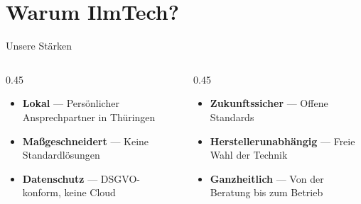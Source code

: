 \documentclass[aspectratio=169]{beamer}
\begin{document}
\section{Warum IlmTech?}

\begin{frame}{Unsere Stärken}
  \begin{columns}[T]
    \begin{column}{0.45\textwidth}
      \begin{itemize}
        \item \textcolor{ilm-blue}{\textbf{Lokal}} — Persönlicher Ansprechpartner in Thüringen
        \item \textcolor{ilm-blue}{\textbf{Maßgeschneidert}} — Keine Standardlösungen
        \item \textcolor{ilm-blue}{\textbf{Datenschutz}} — DSGVO-konform, keine Cloud
      \end{itemize}
    \end{column}
    \begin{column}{0.45\textwidth}
      \begin{itemize}
        \item \textcolor{ilm-blue}{\textbf{Zukunftssicher}} — Offene Standards
        \item \textcolor{ilm-blue}{\textbf{Herstellerunabhängig}} — Freie Wahl der Technik
        \item \textcolor{ilm-blue}{\textbf{Ganzheitlich}} — Von der Beratung bis zum Betrieb
      \end{itemize}
    \end{column}
  \end{columns}
\end{frame}

\thankyouframe
\end{document}
